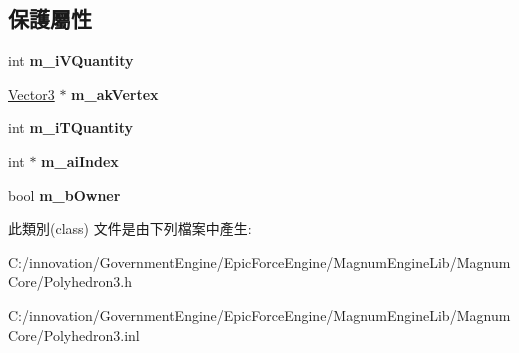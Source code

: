 \subsection*{保護屬性}
\begin{DoxyCompactItemize}
\item 
int {\bfseries m\+\_\+i\+V\+Quantity}\hypertarget{class_i_dream_sky_1_1_polyhedron3_a99e294f40af4dc625ddd7f81a16e7c50}{}\label{class_i_dream_sky_1_1_polyhedron3_a99e294f40af4dc625ddd7f81a16e7c50}

\item 
\hyperlink{class_i_dream_sky_1_1_vector3}{Vector3} $\ast$ {\bfseries m\+\_\+ak\+Vertex}\hypertarget{class_i_dream_sky_1_1_polyhedron3_acfe7f9a8f7c30a44ce32427c7eee47f8}{}\label{class_i_dream_sky_1_1_polyhedron3_acfe7f9a8f7c30a44ce32427c7eee47f8}

\item 
int {\bfseries m\+\_\+i\+T\+Quantity}\hypertarget{class_i_dream_sky_1_1_polyhedron3_a6094089e8306721cf921cdeda24189e7}{}\label{class_i_dream_sky_1_1_polyhedron3_a6094089e8306721cf921cdeda24189e7}

\item 
int $\ast$ {\bfseries m\+\_\+ai\+Index}\hypertarget{class_i_dream_sky_1_1_polyhedron3_a7167ed5ecd7aef5b99c78c493c36296c}{}\label{class_i_dream_sky_1_1_polyhedron3_a7167ed5ecd7aef5b99c78c493c36296c}

\item 
bool {\bfseries m\+\_\+b\+Owner}\hypertarget{class_i_dream_sky_1_1_polyhedron3_a40dc2360cac5088a155b884db7734bbd}{}\label{class_i_dream_sky_1_1_polyhedron3_a40dc2360cac5088a155b884db7734bbd}

\end{DoxyCompactItemize}


此類別(class) 文件是由下列檔案中產生\+:\begin{DoxyCompactItemize}
\item 
C\+:/innovation/\+Government\+Engine/\+Epic\+Force\+Engine/\+Magnum\+Engine\+Lib/\+Magnum\+Core/Polyhedron3.\+h\item 
C\+:/innovation/\+Government\+Engine/\+Epic\+Force\+Engine/\+Magnum\+Engine\+Lib/\+Magnum\+Core/Polyhedron3.\+inl\end{DoxyCompactItemize}
